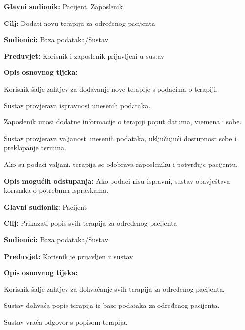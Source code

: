                 \noindent {}
					\begin{packed_item}
						\item \textbf{Glavni sudionik:} Pacijent, Zaposlenik
						\item \textbf{Cilj:} Dodati novu terapiju za određenog pacijenta
						\item \textbf{Sudionici:} Baza podataka/Sustav
						\item \textbf{Preduvjet:} Korisnik i zaposlenik prijavljeni u sustav
						\item \textbf{Opis osnovnog tijeka:}
						
						\begin{packed_enum}
							\item Korisnik šalje zahtjev za dodavanje nove terapije s podacima o terapiji.
							\item Sustav provjerava ispravnost unesenih podataka.
							\item Zaposlenik unosi dodatne informacije o terapiji poput datuma, vremena i sobe.
							\item Sustav provjerava valjanost unesenih podataka, uključujući dostupnost sobe i preklapanje termina.
							\item Ako su podaci valjani, terapija se odobrava zaposleniku i potvrđuje pacijentu.
						\end{packed_enum}
						
						\item \textbf{Opis mogućih odstupanja:} Ako podaci nisu ispravni, sustav obavještava korisnika o potrebnim ispravkama.
						
					\end{packed_item}

                \noindent {}
					\begin{packed_item}
	
						\item \textbf{Glavni sudionik: }Pacijent
						\item  \textbf{Cilj:} Prikazati popis svih terapija za određenog pacijenta
						\item  \textbf{Sudionici:} Baza podataka/Sustav
						\item  \textbf{Preduvjet:} Korisnik je prijavljen u sustav
						\item  \textbf{Opis osnovnog tijeka:}
						
						\item[] \begin{packed_enum}
	
							\item Korisnik šalje zahtjev za dohvaćanje svih terapija za određenog pacijenta.
							\item Sustav dohvaća popis terapija iz baze podataka za određenog pacijenta.
                            \item Sustav vraća odgovor s popisom terapija.
	
						\end{packed_enum}
						
						
					\end{packed_item}

